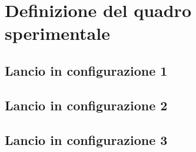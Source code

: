 \chapter{Definizione del quadro sperimentale}
\section{Lancio in configurazione 1}
\section{Lancio in configurazione 2}
\section{Lancio in configurazione 3}